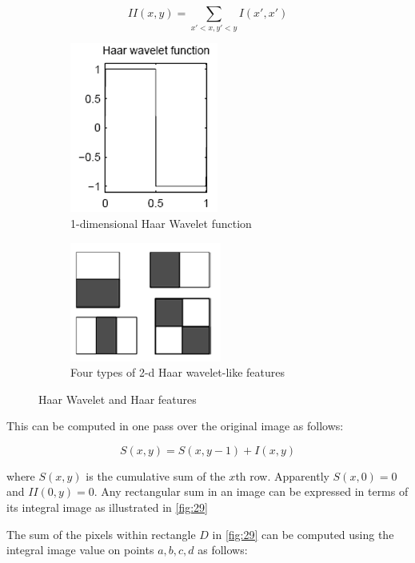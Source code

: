 \documentclass[12pt, twoside]{report}
\begin{document}
	\begin{equation}
		II(x, y) = \sum_{x' < x, y' < y}{I(x' , x')}
	\end{equation}

	\newpage
	\begin{figure}[h!]
		\centering
		\begin{subfigure}{0.5\textwidth}
		\centering
		\includegraphics{img/25_1.png}
		\caption{1-dimensional Haar Wavelet function}
		\label{fig:25_sub1}
		\end{subfigure}%
		\begin{subfigure}{0.5\textwidth}
		\centering
		\includegraphics{img/25_2.png}
		\caption{Four types of 2-d Haar wavelet-like features}
		\label{fig:25_sub2}
		\end{subfigure}
		\caption{Haar Wavelet and Haar features}
		\label{fig:25}
	\end{figure}

	\par
	This can be computed in one pass over the original image as follows:

	\begin{equation}
		S(x, y) = S(x, y - 1) + I(x, y)
	\end{equation}

	where $S(x, y)$ is the cumulative sum of the $x$th row. Apparently $S(x, 0) = 0$ and $II(0, y) = 0$. Any rectangular sum in an image can be expressed in terms of its integral image as illustrated in \ref{fig:29}

	\par
	The sum of the pixels within rectangle $D$ in \ref{fig:29} can be computed using the integral image value on points $a, b, c, d$ as follows:
\end{document}
